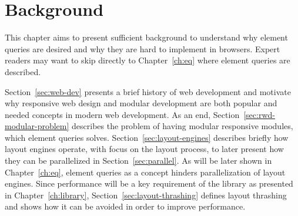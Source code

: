 \documentclass[a4paper,11pt]{kth-mag}
\begin{document}
  \chapter{Background}\label{ch:background}
    This chapter aims to present sufficient background to understand why element queries are desired and why they are hard to implement  in \glspl{browser}.
    Expert readers may want to skip directly to Chapter~\ref{ch:eq} where element queries are described.

    Section~\ref{sec:web-dev} presents a brief history of \gls{web} development and motivate why \gls{responsive} \gls{web} design and modular development are both popular and needed concepts in modern \gls{web} development.
    As an end, Section~\ref{sec:rwd-modular-problem} describes the problem of having modular \gls{responsive} modules, which element queries solves.    
    Section~\ref{sec:layout-engines} describes briefly how \glspl{layout engine} operate, with focus on the layout process, to later present how they can be parallelized in Section~\ref{sec:parallel}.
    As will be later shown in Chapter~\ref{ch:eq}, element queries as a concept hinders parallelization of \glspl{layout engine}.
    Since performance will be a key requirement of the library as presented in Chapter~\ref{ch:library}, Section~\ref{sec:layout-thrashing} defines \gls{layout thrashing} and shows how it can be avoided in order to improve performance.

\end{document}
